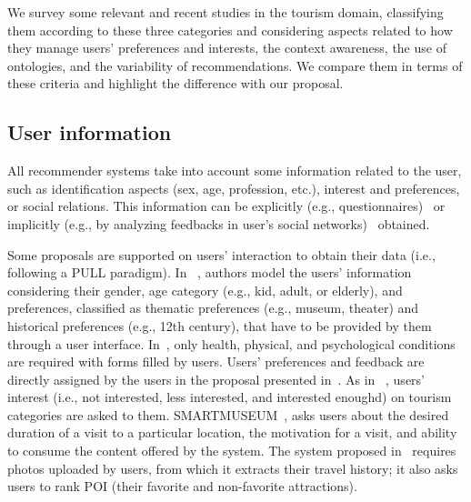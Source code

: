 We survey some relevant and recent studies in the tourism domain, classifying them according to these three categories and considering aspects related to  how they manage users' preferences and interests, the context awareness, the use of ontologies, and the variability of recommendations. We compare %
them in terms of these criteria and highlight the difference with our proposal.    

\vspace{-0.3cm}
\subsection{User information}
All recommender systems take into account some information related to the user, such as identification aspects (sex, age, profession, etc.), interest and preferences, or social relations. This information can be explicitly (e.g., questionnaires)~\cite{jannach2020interactive} or implicitly (e.g., by analyzing feedbacks in user's social networks)~\cite{lin2018hybrid} obtained.  

Some proposals are supported on users' interaction to obtain their data (i.e., following a PULL paradigm). In  %
~\cite{rajaonarivo2019rec}, authors model the users' information considering their gender, age category (e.g., kid, adult, or elderly), and preferences, classified as thematic preferences (e.g., museum, theater) and historical preferences (e.g., 12th century), that have to be provided by them through a user interface.  In~\cite{santos2019using}, only health,  physical, and psychological conditions are required  with forms filled by users. 
Users' preferences and feedback are directly assigned by the users in the proposal presented in~\cite{bahramian_abbaspour_claramunt_2017}. As in ~\cite{arigi2018context}, users' interest (i.e., not interested, less interested, and interested enoughd) on tourism categories are asked to them. SMARTMUSEUM~\cite{ruotsalo2013smartmuseum}, asks users about the desired duration of a visit to a particular location, the motivation for a visit, and ability to consume the content offered by the system. The system proposed in~\cite{shen2016attraction} requires photos uploaded by users, from which it extracts their travel history; it also asks users to rank  POI (their favorite and non-favorite attractions).
 

